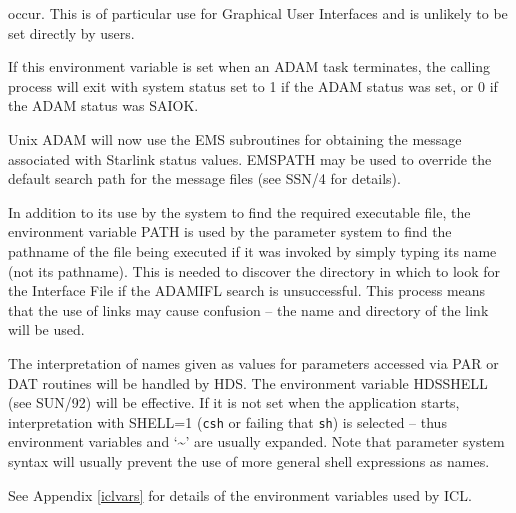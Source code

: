 \documentclass[twoside,11pt]{article}
\newcommand{\xref}[3]{#1}
\renewcommand{\_}{\texttt{\symbol{95}}}
\begin{document}
\begin{description}
occur.
This is of particular use for Graphical User Interfaces and is unlikely
to be set directly by users.
\item[ADAM\_EXIT] If this environment variable is set when an ADAM task
terminates, the calling process will exit with system status set to 1 if
the ADAM status was set, or 0 if the ADAM status was SAI\_\_OK.
\item[EMS\_PATH] Unix ADAM will now use the EMS subroutines for obtaining the
message associated with Starlink status values. EMS\_PATH may be used to 
override the default search path for the message files 
(see 
\xref{SSN/4}{ssn4}{operating_system_specific_routines}
for details).
\item[PATH] In addition to its use by the system to find the required
executable file, the environment variable PATH is used by the parameter
system to find the pathname of the file being executed if it was invoked by 
simply typing its name (not its pathname).
This is needed to discover the directory in which to look for the Interface 
File if the ADAM\_IFL search is unsuccessful.
This process means that the use of links may cause confusion -- the name
and directory of the link will be used.
\item[HDS\_SHELL] The interpretation of names given as values for parameters
accessed via PAR or DAT routines will be handled by HDS.
The environment variable HDS\_SHELL 
(see 
\xref{SUN/92}{sun92}{HDS_SHELL_tuning_parameter}) 
will be effective.
If it is not set when the application starts, interpretation with SHELL=1
(\texttt{csh} or failing that \texttt{sh}) is selected 
-- thus environment variables and `\~{}' are usually expanded.
Note that parameter system syntax will usually prevent the use of more general 
shell expressions as names.
\item[ICL Environment Variables] See Appendix \ref{iclvars} for details of the
environment variables used by ICL.
\end{description}
\end{document}
